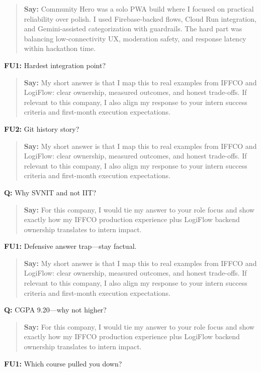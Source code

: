 \documentclass[9pt,a4paper]{article}
\begin{document}
\begin{quote}\small\textbf{Say:} Community Hero was a solo PWA build where I focused on practical reliability over polish. I used Firebase-backed flows, Cloud Run integration, and Gemini-assisted categorization with guardrails. The hard part was balancing low-connectivity UX, moderation safety, and response latency within hackathon time.\end{quote}
\vspace{2mm}
\textbf{FU1:} Hardest integration point?

\begin{quote}\small\textbf{Say:} My short answer is that I map this to real examples from IFFCO and LogiFlow: clear ownership, measured outcomes, and honest trade-offs. If relevant to this company, I also align my response to your intern success criteria and first-month execution expectations.\end{quote}
\vspace{2mm}
\textbf{FU2:} Git history story?

\begin{quote}\small\textbf{Say:} My short answer is that I map this to real examples from IFFCO and LogiFlow: clear ownership, measured outcomes, and honest trade-offs. If relevant to this company, I also align my response to your intern success criteria and first-month execution expectations.\end{quote}
\vspace{2mm}
\textbf{Q:} Why SVNIT and not IIT?

\begin{quote}\small\textbf{Say:} For this company, I would tie my answer to your role focus and show exactly how my IFFCO production experience plus LogiFlow backend ownership translates to intern impact.\end{quote}
\vspace{2mm}
\textbf{FU1:} Defensive answer trap---stay factual.

\begin{quote}\small\textbf{Say:} My short answer is that I map this to real examples from IFFCO and LogiFlow: clear ownership, measured outcomes, and honest trade-offs. If relevant to this company, I also align my response to your intern success criteria and first-month execution expectations.\end{quote}
\vspace{2mm}
\textbf{Q:} CGPA 9.20---why not higher?

\begin{quote}\small\textbf{Say:} For this company, I would tie my answer to your role focus and show exactly how my IFFCO production experience plus LogiFlow backend ownership translates to intern impact.\end{quote}
\vspace{2mm}
\textbf{FU1:} Which course pulled you down?
\end{document}

